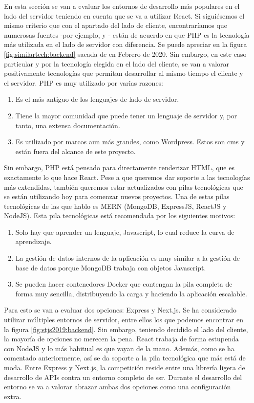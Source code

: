 En esta sección se van a evaluar los entornos de desarrollo más populares en el lado del servidor teniendo en cuenta que se va a utilizar React. Si siguiésemos el mismo criterio que con el apartado del lado de cliente, encontraríamos que numerosas fuentes -por ejemplo, \cite{BKETPF1} y \cite{BKETPF2}- están de acuerdo en que PHP es la tecnología más utilizada en el lado de servidor con diferencia. Se puede apreciar en la figura \cref{fig:similartech:backend} sacada de \cite{BKETPF2} en Febrero de 2020. Sin embargo, en este caso particular y por la tecnología elegida en el lado del cliente, se van a valorar positivamente tecnologías que permitan desarrollar al mismo tiempo el cliente y el servidor. PHP es muy utilizado por varias razones:

\begin{enumerate}
	\item Es el más antiguo de los lenguajes de lado de servidor.
	\item Tiene la mayor comunidad que puede tener un lenguaje de servidor y, por tanto, una extensa documentación.
	\item Es utilizado por marcos aun más grandes, como Wordpress. Estos son \gls{cms} y están fuera del alcance de este proyecto.
\end{enumerate}

Sin embargo, PHP está pensado para directamente renderizar HTML, que es exactamente lo que hace React. Pese a que queremos dar soporte a las tecnologías más extendidas, también queremos estar actualizados con pilas tecnológicas que se están utilizando hoy para comenzar nuevos proyectos. Una de estas pilas tecnológicas de las que hablo es MERN (MongoDB, ExpressJS, ReactJS y NodeJS). Esta pila tecnológicas está recomendada por los siguientes motivos:

\begin{enumerate}
	\item Solo hay que aprender un lenguaje, Javascript, lo cual reduce la curva de aprendizaje.
	\item La gestión de datos internos de la aplicación es muy similar a la gestión de base de datos porque MongoDB trabaja con objetos Javascript.
	\item Se pueden hacer contenedores Docker que contengan la pila completa de forma muy sencilla, distribuyendo la carga y haciendo la aplicación escalable.
\end{enumerate}

Para esto se van a evaluar dos opciones: Express y Next.js. Se ha considerado utilizar múltiples entornos de servidor, entre ellos los que podemos encontrar en la figura \cref{fig:stjs2019:backend}. Sin embargo, teniendo decidido el lado del cliente, la mayoría de opciones no merecen la pena. React trabaja de forma estupenda con NodeJS y lo más habitual es que vayan de la mano. Además, como se ha comentado anteriormente, así se da soporte a la pila tecnológica que más está de moda. Entre Express y Next.js, la competición reside entre una librería ligera de desarrollo de APIs contra un entorno completo de \gls{ssr}. Durante el desarrollo del entorno se va a valorar abrazar ambas dos opciones como una configuración extra.


